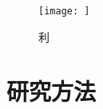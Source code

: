 \documentclass{cjc}
\begin{document}
\begin{figure}[htbp]
\centering
\texttt{[image: ]}
\caption{利}
\label{fig:logo}
\end{figure}

\section{研究方法}
\nocite{*}



\end{document}
